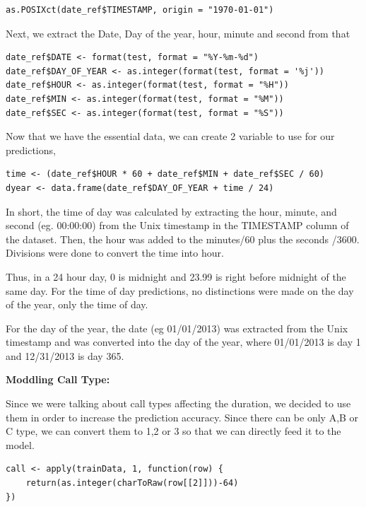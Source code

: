 \documentclass[11pt]{article}
\begin{document}
\begin{lstlisting}
as.POSIXct(date_ref$TIMESTAMP, origin = "1970-01-01")
\end{lstlisting}
\par
Next, we extract the Date, Day of the year, hour, minute and second from that
\begin{lstlisting}
date_ref$DATE <- format(test, format = "%Y-%m-%d")
date_ref$DAY_OF_YEAR <- as.integer(format(test, format = '%j'))
date_ref$HOUR <- as.integer(format(test, format = "%H"))
date_ref$MIN <- as.integer(format(test, format = "%M"))
date_ref$SEC <- as.integer(format(test, format = "%S"))
\end{lstlisting}

\par
Now that we have the essential data, we can create 2 variable to use for our predictions, 
\begin{lstlisting}
time <- (date_ref$HOUR * 60 + date_ref$MIN + date_ref$SEC / 60)
dyear <- data.frame(date_ref$DAY_OF_YEAR + time / 24)  
\end{lstlisting}

\par
In short, the time of day was calculated by extracting the hour, minute, and second (eg. 00:00:00) from the Unix timestamp in the TIMESTAMP column of the dataset. Then, the hour was added to the minutes/60 plus the seconds /3600. Divisions were done to convert the time into hour.

\par
Thus, in a 24 hour day, 0 is midnight and 23.99 is right before midnight of the same day. For the time of day predictions, no distinctions were made on the day of the year, only the time of day. 
\par
For the day of the year, the date (eg 01/01/2013) was extracted from the Unix timestamp and was converted into the day of the year, where 01/01/2013 is day 1 and 12/31/2013 is day 365. 

\textbf{Moddling Call Type:}
\par
Since we were talking about call types affecting the duration, we decided to use them in order to increase the prediction accuracy. Since there can be only A,B or C type, we can convert them to 1,2 or 3 so that we can directly feed it to the model.

\begin{lstlisting}
call <- apply(trainData, 1, function(row) {
	return(as.integer(charToRaw(row[[2]]))-64)
})
\end{lstlisting}
\end{document}

